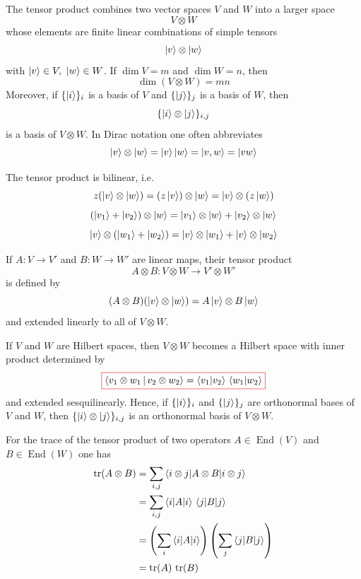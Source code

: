 \begin{digression}\label{dig:tensor-products}
The tensor product combines two vector spaces \(V\) and \(W\) into a larger space
\[
V\otimes W
\]
whose elements are finite linear combinations of simple tensors
\[
\ket{v}\otimes\ket{w}
\]
with
\(
\ket{v}\in V,\ \ket{w}\in W
\).
If \(\dim V=m\) and \(\dim W=n\), then
\[
\dim(V\otimes W)=mn
\]
Moreover, if \(\{\ket{i}\}_i\) is a basis of \(V\) and \(\{\ket{j}\}_j\) is a basis of \(W\), then
\[
\{\ket{i}\otimes\ket{j}\}_{i,j}
\]
is a basis of \(V\otimes W\). In Dirac notation one often abbreviates
\[
\ket{v}\otimes\ket{w}
=
\ket{v}\ket{w}
=
\ket{v,w}
=
\ket{vw}
\]

The tensor product is bilinear, i.e.
\[
z(\ket{v}\otimes\ket{w})
=
(z\ket{v})\otimes\ket{w}
=
\ket{v}\otimes(z\ket{w})
\]
\[
(\ket{v_1}+\ket{v_2})\otimes\ket{w}
=
\ket{v_1}\otimes\ket{w}
+
\ket{v_2}\otimes\ket{w}
\]
\[
\ket{v}\otimes(\ket{w_1}+\ket{w_2})
=
\ket{v}\otimes\ket{w_1}
+
\ket{v}\otimes\ket{w_2}
\]

If \(A\colon V\to V'\) and \(B\colon W\to W'\) are linear maps, their tensor product
\[
A\otimes B \colon V\otimes W \to V'\otimes W'
\]
is defined by
\[
(A\otimes B)(\ket{v}\otimes\ket{w})
=
A\ket{v}\otimes B\ket{w}
\]
and extended linearly to all of \(V\otimes W\).

If \(V\) and \(W\) are Hilbert spaces, then \(V\otimes W\) becomes a Hilbert space with inner product determined by
\begin{equation}\label{eq:inner-product-tensor-product}
{\color{red}\boxed{\color{black}
\braket{v_1\otimes w_1\,|\,v_2\otimes w_2}
=
\braket{v_1|v_2}\,\braket{w_1|w_2}
}}
\end{equation}
and extended sesquilinearly.
Hence, if $\{\ket{i}\}_i$ and $\{\ket{j}\}_j$ are orthonormal bases of $V$ and $W$, then $\{\ket{i}\otimes\ket{j}\}_{i,j}$ is an orthonormal basis of $V\otimes W$.

For the trace of the tensor product of two operators \(A \in \operatorname{End}(V)\) and \(B \in \operatorname{End}(W)\) one has
\[
\begin{aligned}
\operatorname{tr}(A\otimes B)
&=
\sum_{i,j} \braket{i \otimes j | A\otimes B | i \otimes j} \\
&=
\sum_{i,j} \braket{i|A|i}\,\braket{j|B|j} \\
&=
\left(\sum_i \braket{i|A|i}\right) \left(\sum_j \braket{j|B|j}\right) \\
&=
\operatorname{tr}(A)\,\operatorname{tr}(B)
\end{aligned}
\]


\end{digression}
